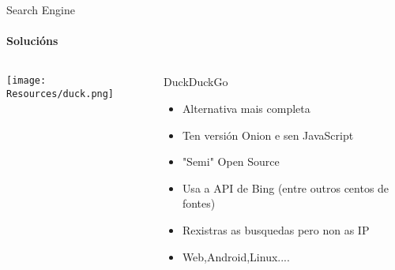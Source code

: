 \documentclass{beamer}
\begin{document}
\begin{frame}{Search Engine}
  \framesubtitle{Solucións}

  \begin{columns}
    \begin{column}{0.5\textwidth}
      \texttt{[image: Resources/duck.png]}

      \vspace{1cm}


    \end{column}

    \begin{column}{0.5\textwidth}
      \begin{block}{DuckDuckGo}
        \begin{itemize}
          \item Alternativa mais completa
          \item Ten versión Onion e sen JavaScript
          \item "Semi" Open Source
          \item Usa a API de Bing (entre outros centos de fontes)
          \item Rexistras as busquedas pero non as IP
          \item Web,Android,Linux....
        \end{itemize}
      \end{block}

    \end{column}

  \end{columns}

\end{frame}

\end{document}
